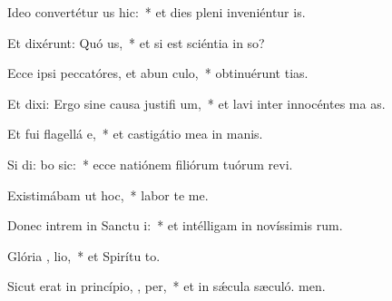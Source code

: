 \item Ideo convertétur  us hic:~* et dies pleni inveniéntur  is.
\item Et dixérunt: Quó  us,~* et si est sciéntia in so?
\item Ecce ipsi peccatóres, et abun  culo,~* obtinuérunt tias.
\item Et dixi: Ergo sine causa justifi  um,~* et lavi inter innocéntes ma as.
\item Et fui flagellá  e,~* et castigátio mea in manis.
\item Si di: bo sic:~* ecce natiónem filiórum tuórum revi.
\item Existimábam ut  hoc,~* labor  te me.
\item Donec intrem in Sanctu i:~* et intélligam in novíssimis rum.
\item Glória ,  lio,~* et Spirítu to.
\item Sicut erat in princípio,  ,  per,~* et in sǽcula sæculó. men.
